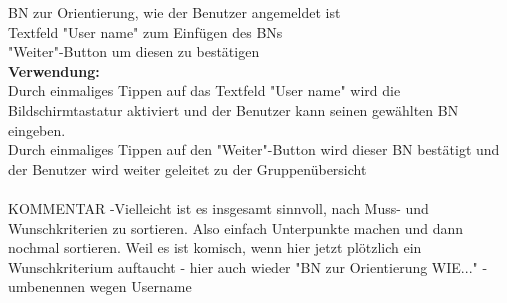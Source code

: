 BN zur Orientierung, wie der Benutzer angemeldet ist\\
Textfeld "User name" zum Einfügen des BNs\\
"Weiter"-Button um diesen zu bestätigen\\
\textbf{Verwendung:}\\
Durch einmaliges Tippen auf das Textfeld "User name" wird die Bildschirmtastatur aktiviert und der Benutzer kann seinen gewählten BN eingeben.\\
Durch einmaliges Tippen auf den "Weiter"-Button wird dieser BN bestätigt und der Benutzer wird weiter geleitet zu der Gruppenübersicht\\ \\

KOMMENTAR
-Vielleicht ist es insgesamt sinnvoll, nach Muss- und Wunschkriterien zu sortieren. Also einfach Unterpunkte machen und dann nochmal sortieren. Weil es ist komisch, wenn hier jetzt plötzlich ein Wunschkriterium auftaucht
- hier auch wieder "BN zur Orientierung WIE..."
- umbenennen wegen Username


